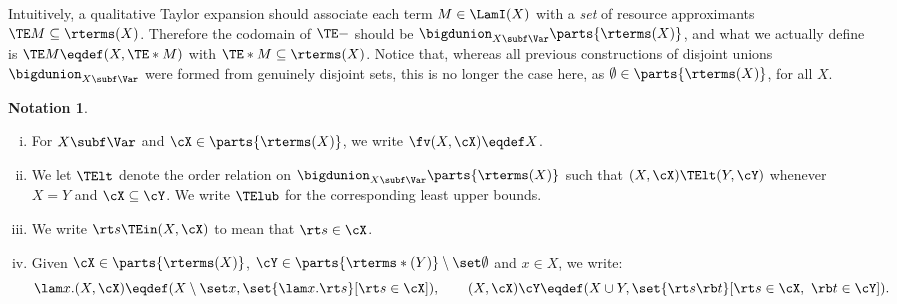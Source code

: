 \documentclass[10pt,a4paper]{amsart}
\theoremstyle{definition}
\newtheorem{notation}[theorem]{Notation}
\newcommand{\bsub}{\begin{enumerate}[(i)]}
\newcommand{\esub}{\end{enumerate}}
\begin{document}
Intuitively, a qualitative Taylor expansion should associate each term $M \in \LamI(X)$ with a \emph{set} of resource approximants $\TE M \subseteq \rterms(X)$.
Therefore the codomain of $\TE -$ should be $\bigdunion_{X \subf \Var} \parts{\rterms(X)}$, and what we actually define is $\TE M \eqdef (X, \TE* M)$ with $\TE* M \subseteq \rterms(X)$.
Notice that, whereas all previous constructions of disjoint unions
$\bigdunion_{X \subf \Var}$ were formed from genuinely disjoint sets,
this is no longer the case here, as $\emptyset \in \parts{\rterms(X)}$, for all $X$.
\begin{notation}\mbox{}
\bsub
\item For $X \subf \Var$ and $\cX \in \parts{\rterms(X)}$,
	we write $\fv(X,\cX) \eqdef X$.
\item We let $\mathord{\TElt}$ denote the order relation
	on $\bigdunion_{X \subf \Var} \parts{\rterms(X)}$
	such that $(X,\cX) \TElt (Y,\cY)$
	whenever $X = Y$ and $\cX \subseteq \cY$.
	We write $\TElub$ for the corresponding least upper bounds.
\item We write $\rt s \TEin (X,\cX)$ to mean that $\rt s \in \cX$.
\item Given $\cX \in \parts{\rterms(X)}$, 
	$\cY \in \parts{\rterms*(Y)} \setminus \set\emptyset $
	and $x \in X$, we write:
	\[	\lam x.(X,\cX) \eqdef (X \setminus \set x, \set{\lam x.\rt s}[\rt s\in\cX]), \qquad
		(X,\cX) \cY \eqdef (X \cup Y, \set{\rt s\rb t}[\rt s \in \cX,\ \rb t \in \cY]). 
	\]
\esub
\end{notation}
\end{document}
